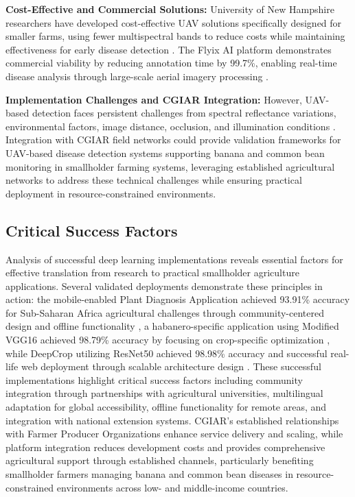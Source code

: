 \documentclass[sn-mathphys]{sn-jnl}
\theoremstyle{thmstyleone}%
\theoremstyle{thmstyletwo}%
\theoremstyle{thmstylethree}%
\begin{document}
\textbf{Cost-Effective and Commercial Solutions:} University of New Hampshire researchers have developed cost-effective UAV solutions specifically designed for smaller farms, using fewer multispectral bands to reduce costs while maintaining effectiveness for early disease detection \citep{unh2024drones}. The Flyix AI platform demonstrates commercial viability by reducing annotation time by 99.7\%, enabling real-time disease analysis through large-scale aerial imagery processing \citep{flypix2025crop}.

\textbf{Implementation Challenges and CGIAR Integration:} However, UAV-based detection faces persistent challenges from spectral reflectance variations, environmental factors, image distance, occlusion, and illumination conditions \citep{mdpi2023drones, springer2023precision, frontiers2022drone}. Integration with CGIAR field networks could provide validation frameworks for UAV-based disease detection systems supporting banana and common bean monitoring in smallholder farming systems, leveraging established agricultural networks to address these technical challenges while ensuring practical deployment in resource-constrained environments.

\subsection{Critical Success Factors}

Analysis of successful deep learning implementations reveals essential factors for effective translation from research to practical smallholder agriculture applications. Several validated deployments demonstrate these principles in action: the mobile-enabled Plant Diagnosis Application achieved 93.91\% accuracy for Sub-Saharan Africa agricultural challenges through community-centered design and offline functionality \citep{frontiers2023mpd}, a habanero-specific application using Modified VGG16 achieved 98.79\% accuracy by focusing on crop-specific optimization \citep{nature2024habanero}, while DeepCrop utilizing ResNet50 achieved 98.98\% accuracy and successful real-life web deployment through scalable architecture design \citep{sciencedirect2023deepcrop}.
These successful implementations highlight critical success factors including community integration through partnerships with agricultural universities, multilingual adaptation for global accessibility, offline functionality for remote areas, and integration with national extension systems. CGIAR's established relationships with Farmer Producer Organizations enhance service delivery and scaling, while platform integration reduces development costs and provides comprehensive agricultural support through established channels, particularly benefiting smallholder farmers managing banana and common bean diseases in resource-constrained environments across low- and middle-income countries.
\end{document}
